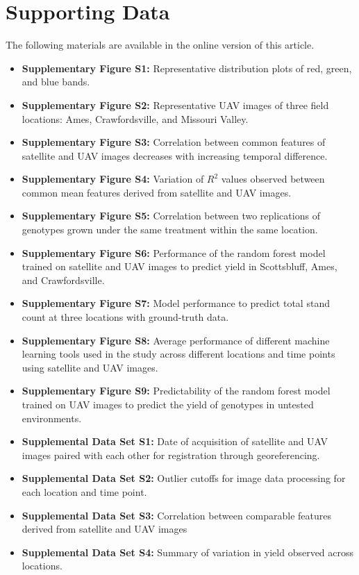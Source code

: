 \documentclass[12pt,twoside]{gsag3jnl}
\begin{document}
\section{Supporting Data}
\label{sec:supplemental}
The following materials are available in the online version of this article.
\begin{itemize}
\item \textbf{Supplementary Figure S1:} Representative distribution plots of red, green, and blue bands.
\item \textbf{Supplementary Figure S2:} Representative UAV images of three field locations: Ames, Crawfordsville, and Missouri Valley.
\item \textbf{Supplementary Figure S3:} Correlation between common features of satellite and UAV images decreases with increasing temporal difference.
\item \textbf{Supplementary Figure S4:} Variation of $R^2$ values observed between common mean features derived from satellite and UAV images.
\item \textbf{Supplementary Figure S5:} Correlation between two replications of genotypes grown under the same treatment within the same location.
\item \textbf{Supplementary Figure S6:} Performance of the random forest model trained on satellite and UAV images to predict yield in Scottsbluff, Ames, and Crawfordsville.
\item \textbf{Supplementary Figure S7:} Model performance to predict total stand count at three locations with ground-truth data.
\item \textbf{Supplementary Figure S8:} Average performance of different machine learning tools used in the study across different locations and time points using satellite and UAV images.
\item \textbf{Supplementary Figure S9:} Predictability of the random forest model trained on UAV images to predict the yield of genotypes in untested environments.
\\
\item \textbf{Supplemental Data Set S1:} Date of acquisition of satellite and UAV images paired with each other for registration through georeferencing.
\item \textbf{Supplemental Data Set S2:} Outlier cutoffs for image data processing for each location and time point.
\item \textbf{Supplemental Data Set S3:} Correlation between comparable features derived from satellite and UAV images
\item \textbf{Supplemental Data Set S4:} Summary of variation in yield observed across locations.

\end{itemize}
\end{document}
